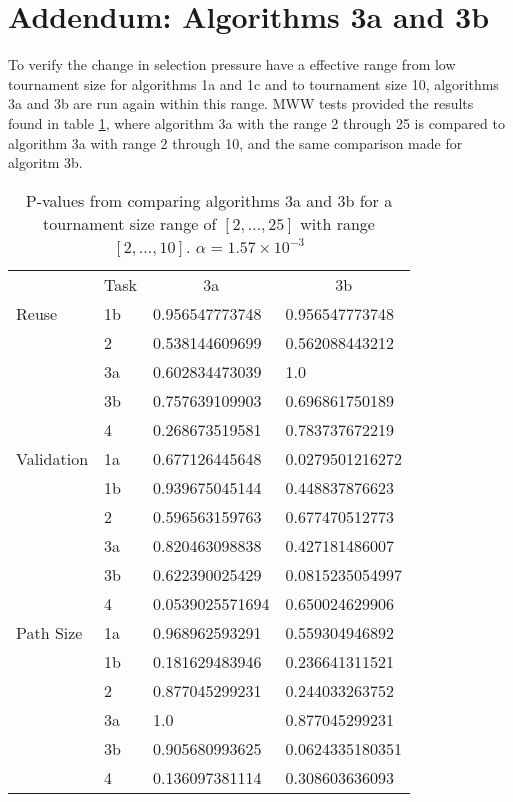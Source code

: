 \section{Addendum: Algorithms 3a and 3b}
To verify the change in selection pressure have a effective range from low tournament size for algorithms 1a and 1c and to tournament size 10, algorithms 3a and 3b are run again within this range. MWW tests provided the results found in table \ref{tab:exp2.dynamic_rerun}, where algorithm 3a with the range 2 through 25 is compared to algorithm 3a with range 2 through 10, and the same comparison made for algoritm 3b. 

\begin{table}[h]
    \centering
    \begin{tabular}{llll}
               & Task & \multicolumn{1}{c}{3a} & \multicolumn{1}{c}{3b} \\
    Reuse      & 1b   & 0.956547773748         & 0.956547773748         \\
               & 2    & 0.538144609699         & 0.562088443212         \\
               & 3a   & 0.602834473039         & 1.0                    \\
               & 3b   & 0.757639109903         & 0.696861750189         \\
               & 4    & 0.268673519581         & 0.783737672219         \\
    Validation & 1a   & 0.677126445648         & 0.0279501216272        \\
               & 1b   & 0.939675045144         & 0.448837876623         \\
               & 2    & 0.596563159763         & 0.677470512773         \\
               & 3a   & 0.820463098838         & 0.427181486007         \\
               & 3b   & 0.622390025429         & 0.0815235054997        \\
               & 4    & 0.0539025571694        & 0.650024629906         \\
    Path Size  & 1a   & 0.968962593291         & 0.559304946892         \\
               & 1b   & 0.181629483946         & 0.236641311521         \\
               & 2    & 0.877045299231         & 0.244033263752         \\
               & 3a   & 1.0                    & 0.877045299231         \\
               & 3b   & 0.905680993625         & 0.0624335180351        \\
               & 4    & 0.136097381114         & 0.308603636093        
    \end{tabular}
    \caption{P-values from comparing algorithms 3a and 3b for a tournament size range of \([2,\dots,25]\) with range \([2,\dots,10]\). \(\alpha=1.57\times 10^{-3}\)}
    \label{tab:exp2.dynamic_rerun}
\end{table}

